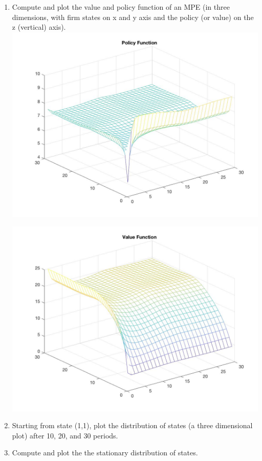\documentclass[11pt]{article}
\begin{document}
\begin{enumerate}
\item Compute and plot the value and policy function of an MPE (in three dimensions, with firm states on x and y axis and the policy (or value) on the z (vertical) axis). \\[2em]

\includegraphics[scale=0.2]{Pol.jpg}

\includegraphics[scale=0.2]{val.jpg}


\item Starting from state (1,1), plot the distribution of states (a three dimensional plot) after 10, 20, and 30 periods.  
\item Compute and plot the the stationary distribution of states.
\end{enumerate}

%
%
\end{document}
